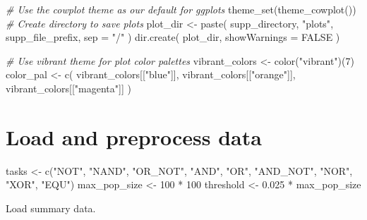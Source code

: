 \documentclass[
]{book}
\newenvironment{Shaded}{\begin{snugshade}}{\end{snugshade}}
\newcommand{\AttributeTok}[1]{\textcolor[rgb]{0.77,0.63,0.00}{#1}}
\newcommand{\CommentTok}[1]{\textcolor[rgb]{0.56,0.35,0.01}{\textit{#1}}}
\newcommand{\ConstantTok}[1]{\textcolor[rgb]{0.00,0.00,0.00}{#1}}
\newcommand{\DecValTok}[1]{\textcolor[rgb]{0.00,0.00,0.81}{#1}}
\newcommand{\FloatTok}[1]{\textcolor[rgb]{0.00,0.00,0.81}{#1}}
\newcommand{\FunctionTok}[1]{\textcolor[rgb]{0.00,0.00,0.00}{#1}}
\newcommand{\NormalTok}[1]{#1}
\newcommand{\OtherTok}[1]{\textcolor[rgb]{0.56,0.35,0.01}{#1}}
\newcommand{\SpecialCharTok}[1]{\textcolor[rgb]{0.00,0.00,0.00}{#1}}
\newcommand{\StringTok}[1]{\textcolor[rgb]{0.31,0.60,0.02}{#1}}
\begin{document}
\begin{Shaded}
\begin{Highlighting}[]
\CommentTok{\# Use the cowplot theme as our default for ggplots}
\FunctionTok{theme\_set}\NormalTok{(}\FunctionTok{theme\_cowplot}\NormalTok{())}
\CommentTok{\# Create directory to save plots}
\NormalTok{plot\_dir }\OtherTok{\textless{}{-}} \FunctionTok{paste}\NormalTok{(}
\NormalTok{  supp\_directory,}
  \StringTok{"plots"}\NormalTok{,}
\NormalTok{  supp\_file\_prefix,}
  \AttributeTok{sep =} \StringTok{"/"}
\NormalTok{)}
\FunctionTok{dir.create}\NormalTok{(}
\NormalTok{  plot\_dir,}
  \AttributeTok{showWarnings =} \ConstantTok{FALSE}
\NormalTok{)}

\CommentTok{\# Use vibrant theme for plot color palettes}
\NormalTok{vibrant\_colors }\OtherTok{\textless{}{-}} \FunctionTok{color}\NormalTok{(}\StringTok{"vibrant"}\NormalTok{)(}\DecValTok{7}\NormalTok{)}
\NormalTok{color\_pal }\OtherTok{\textless{}{-}} \FunctionTok{c}\NormalTok{(}
\NormalTok{  vibrant\_colors[[}\StringTok{"blue"}\NormalTok{]],}
\NormalTok{  vibrant\_colors[[}\StringTok{"orange"}\NormalTok{]],}
\NormalTok{  vibrant\_colors[[}\StringTok{"magenta"}\NormalTok{]]}
\NormalTok{)}
\end{Highlighting}
\end{Shaded}

\hypertarget{load-and-preprocess-data}{%
\section{Load and preprocess data}\label{load-and-preprocess-data}}

\begin{Shaded}
\begin{Highlighting}[]
\NormalTok{tasks }\OtherTok{\textless{}{-}} \FunctionTok{c}\NormalTok{(}\StringTok{"NOT"}\NormalTok{, }\StringTok{"NAND"}\NormalTok{, }\StringTok{"OR\_NOT"}\NormalTok{, }\StringTok{"AND"}\NormalTok{, }\StringTok{"OR"}\NormalTok{, }\StringTok{"AND\_NOT"}\NormalTok{, }\StringTok{"NOR"}\NormalTok{, }\StringTok{"XOR"}\NormalTok{, }\StringTok{"EQU"}\NormalTok{)}
\NormalTok{max\_pop\_size }\OtherTok{\textless{}{-}} \DecValTok{100} \SpecialCharTok{*} \DecValTok{100}
\NormalTok{threshold }\OtherTok{\textless{}{-}} \FloatTok{0.025} \SpecialCharTok{*}\NormalTok{ max\_pop\_size}
\end{Highlighting}
\end{Shaded}

Load summary data.
\end{document}
